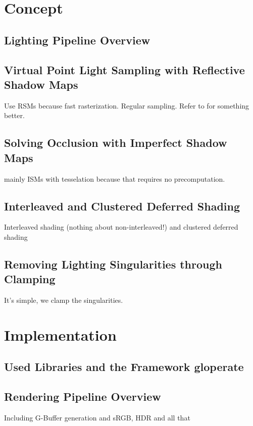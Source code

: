 
\chapter{Concept}

\section{Lighting Pipeline Overview}

\section{Virtual Point Light Sampling with Reflective Shadow Maps}
Use RSMs because fast rasterization.
Regular sampling. Refer to \citep{hedman2016sequential} for something better.

\section{Solving Occlusion with Imperfect Shadow Maps}
mainly ISMs \citep{ritschel2008ism} with tesselation \citep{barak2013temporally} because that requires no precomputation.

\section{Interleaved and Clustered Deferred Shading}
Interleaved shading \citep{Keller:2001:Interleaved} (nothing about non-interleaved!) and clustered deferred shading \citep{olsson2012clustered}

\section{Removing Lighting Singularities through Clamping}
It's simple, we clamp the singularities.



\chapter{Implementation}

\section{Used Libraries and the Framework gloperate}

\section{Rendering Pipeline Overview}
Including G-Buffer generation and sRGB, HDR and all that


